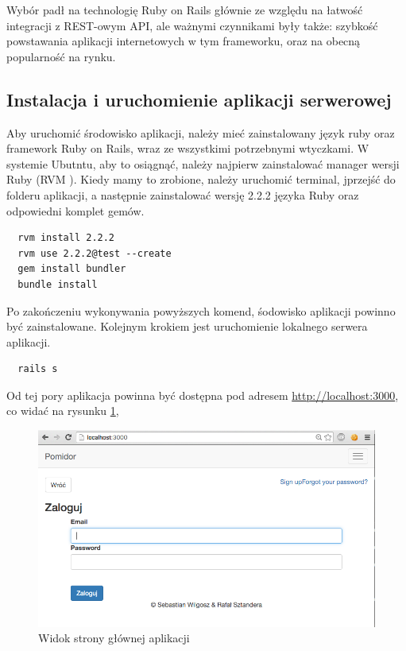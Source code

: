Wybór padł na technologię Ruby on Rails głównie ze względu na łatwość integracji z REST-owym API, ale ważnymi czynnikami były także: szybkość powstawania aplikacji internetowych w tym frameworku, oraz na obecną popularność na rynku.

\subsection {Instalacja i uruchomienie aplikacji serwerowej}

Aby uruchomić środowisko aplikacji, należy mieć zainstalowany język ruby oraz framework Ruby on Rails, wraz ze wszystkimi potrzebnymi wtyczkami. W systemie Ubutntu, aby to osiągnąć, należy najpierw zainstalować manager wersji Ruby (RVM \cite{bib:rvm-install}). Kiedy mamy to zrobione, należy uruchomić terminal, jprzejść do folderu aplikacji, a następnie zainstalować wersję 2.2.2 języka Ruby oraz odpowiedni komplet gemów.

\begin{lstlisting}
  rvm install 2.2.2
  rvm use 2.2.2@test --create
  gem install bundler
  bundle install
\end{lstlisting}


Po zakończeniu wykonywania powyższych komend, śodowisko aplikacji powinno być zainstalowane. Kolejnym krokiem jest uruchomienie lokalnego serwera aplikacji.

\begin{lstlisting}
  rails s
\end{lstlisting}

Od tej pory aplikacja powinna być dostępna pod adresem \url{http://localhost:3000}, co widać na rysunku \ref{figure:root-page-server},

\begin{figure}[ht]
  \centering
  \includegraphics[scale=0.35]{images/root-page-server.png}
  \caption{Widok strony głównej aplikacji}
  \label{figure:root-page-server}
\end{figure}
\FloatBarrier
